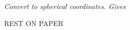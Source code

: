 \documentclass[11pt]{article}
\newenvironment{solution}
  {\textit{Solution.}}
\newcommand{\mysqrt}[1]{%
  \mathpalette\foo{#1}%
}
\newcommand{\sol}[1]{
    \begin{customframedproof}[linecolor=orangehdx!75,]
        \begin{solution}
        #1
        \end{solution}
    \end{customframedproof}
}
\newcommand{\foo}[2]{%
  \sbox0{$#1\sqrt{#2}$}%
  \begin{tikzpicture}[baseline=(sqrt.base)]
    \node[inner sep=0, outer sep=0] (sqrt) {$#1\sqrt{#2}$}; %
    \draw([yshift=-0.045em]sqrt.north east) -- ++(0,-0.5ex); %
  \end{tikzpicture}%
}
\begin{document}
\begin{enumerate}
\begin{enumerate}
          
              \textit{Convert to spherical coordinates. Gives}
        \end{enumerate}




  
\end{enumerate}
\vspace{2cm}
\begin{center}
\textsc{REST ON PAPER}
\end{center}
\end{document}
